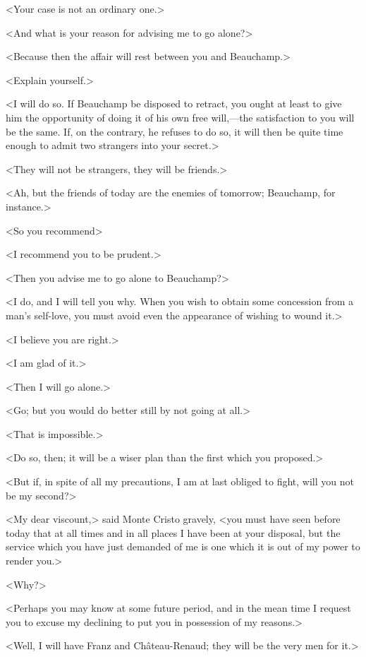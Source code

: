  <Your case is not an ordinary one.> 

 <And what is your reason for advising me to go alone?> 

 <Because then the affair will rest between you and Beauchamp.> 

 <Explain yourself.> 

 <I will do so. If Beauchamp be disposed to retract, you ought at least to give him the opportunity of doing it of his own free will,—the satisfaction to you will be the same. If, on the contrary, he refuses to do so, it will then be quite time enough to admit two strangers into your secret.> 

 <They will not be strangers, they will be friends.> 

 <Ah, but the friends of today are the enemies of tomorrow; Beauchamp, for instance.> 

 <So you recommend\longdash> 

 <I recommend you to be prudent.> 

 <Then you advise me to go alone to Beauchamp?> 

 <I do, and I will tell you why. When you wish to obtain some concession from a man's self-love, you must avoid even the appearance of wishing to wound it.> 

 <I believe you are right.> 

 <I am glad of it.> 

 <Then I will go alone.> 

 <Go; but you would do better still by not going at all.> 

 <That is impossible.> 

 <Do so, then; it will be a wiser plan than the first which you proposed.> 

 <But if, in spite of all my precautions, I am at last obliged to fight, will you not be my second?> 

 <My dear viscount,> said Monte Cristo gravely, <you must have seen before today that at all times and in all places I have been at your disposal, but the service which you have just demanded of me is one which it is out of my power to render you.> 

 <Why?> 

 <Perhaps you may know at some future period, and in the mean time I request you to excuse my declining to put you in possession of my reasons.> 

 <Well, I will have Franz and Château-Renaud; they will be the very men for it.> 

